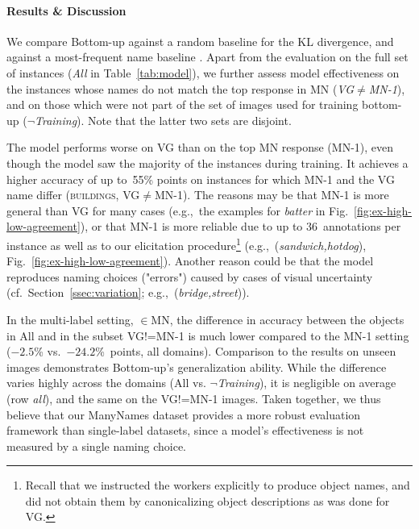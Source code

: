 \paragraph{Results \& Discussion} 
We compare Bottom-up against a random baseline for the KL divergence, and against a most-frequent name baseline . 
Apart from the evaluation on the full set of instances (\textit{\mbox{All}} in Table~\ref{tab:model}), we further assess model effectiveness on the instances whose  \vg names do not match the top response in MN (\mbox{\textit{VG}$\neq$\textit{MN-1}}), and on those which were not part of the set of images used for training bottom-up (\mbox{$\neg$\textit{Training}}).
Note that the latter two sets are disjoint. 
%

The model performs worse on VG than on the top MN response (MN-1), even though the model saw the majority of the instances during training. 
It achieves a higher accuracy of up to\ 55\% points on instances for which MN-1 and the VG name differ (\textsc{buildings}, VG$\neq$MN-1). 
The reasons may be that MN-1 is more general than VG for many cases (e.g.,\ the examples for \textsl{batter} in Fig.\ \ref{fig:ex-high-low-agreement}), or that MN-1 is more reliable due to up to $36$~annotations per instance as well as to our elicitation procedure\footnote{Recall that we instructed the workers explicitly to produce object names, and did not obtain them by canonicalizing object descriptions as was done for VG.} (e.g.,\ (\textsl{sandwich,hotdog}), Fig.\ \ref{fig:ex-high-low-agreement}). 
Another reason could be that the model reproduces naming choices ("errors") caused by cases of visual uncertainty (cf.\ Section\ \ref{ssec:variation}; e.g.,\ (\textsl{bridge,street})). 

In the multi-label setting, $\in$MN, the difference in accuracy between the objects in All and in the subset VG!=MN-1 is much lower compared to the MN-1 setting ($-2.5$\% vs.\ $-24.2$\%\ points, all domains). 
Comparison to the results on unseen images demonstrates Bottom-up's generalization ability. 
While the difference varies highly across the domains (All vs. \mbox{$\neg$\textit{Training}}), it is negligible on average (row \textit{all}), and the same on the \mbox{VG!=MN-1} images. 
Taken together, we thus believe that our ManyNames dataset provides a more robust evaluation framework than single-label datasets, since a model's effectiveness is not measured by a single naming choice. 

